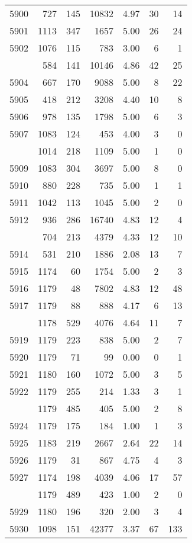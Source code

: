 \documentclass[
]{article}
\begin{document}
\begin{table}
\begin{tabular}[t]{lrrrrrr}
5900 & 727 & 145 & 10832 & 4.97 & 30 & 14\\
5901 & 1113 & 347 & 1657 & 5.00 & 26 & 24\\
5902 & 1076 & 115 & 783 & 3.00 & 6 & 1\\
\addlinespace
5903 & 584 & 141 & 10146 & 4.86 & 42 & 25\\
5904 & 667 & 170 & 9088 & 5.00 & 8 & 22\\
5905 & 418 & 212 & 3208 & 4.40 & 10 & 8\\
5906 & 978 & 135 & 1798 & 5.00 & 6 & 3\\
5907 & 1083 & 124 & 453 & 4.00 & 3 & 0\\
\addlinespace
5908 & 1014 & 218 & 1109 & 5.00 & 1 & 0\\
5909 & 1083 & 304 & 3697 & 5.00 & 8 & 0\\
5910 & 880 & 228 & 735 & 5.00 & 1 & 1\\
5911 & 1042 & 113 & 1045 & 5.00 & 2 & 0\\
5912 & 936 & 286 & 16740 & 4.83 & 12 & 4\\
\addlinespace
5913 & 704 & 213 & 4379 & 4.33 & 12 & 10\\
5914 & 531 & 210 & 1886 & 2.08 & 13 & 7\\
5915 & 1174 & 60 & 1754 & 5.00 & 2 & 3\\
5916 & 1179 & 48 & 7802 & 4.83 & 12 & 48\\
5917 & 1179 & 88 & 888 & 4.17 & 6 & 13\\
\addlinespace
5918 & 1178 & 529 & 4076 & 4.64 & 11 & 7\\
5919 & 1179 & 223 & 838 & 5.00 & 2 & 7\\
5920 & 1179 & 71 & 99 & 0.00 & 0 & 1\\
5921 & 1180 & 160 & 1072 & 5.00 & 3 & 5\\
5922 & 1179 & 255 & 214 & 1.33 & 3 & 1\\
\addlinespace
5923 & 1179 & 485 & 405 & 5.00 & 2 & 8\\
5924 & 1179 & 175 & 184 & 1.00 & 1 & 3\\
5925 & 1183 & 219 & 2667 & 2.64 & 22 & 14\\
5926 & 1179 & 31 & 867 & 4.75 & 4 & 3\\
5927 & 1174 & 198 & 4039 & 4.06 & 17 & 57\\
\addlinespace
5928 & 1179 & 489 & 423 & 1.00 & 2 & 0\\
5929 & 1180 & 196 & 320 & 2.00 & 3 & 4\\
5930 & 1098 & 151 & 42377 & 3.37 & 67 & 133\\

\end{tabular}
\end{table}
\end{document}

